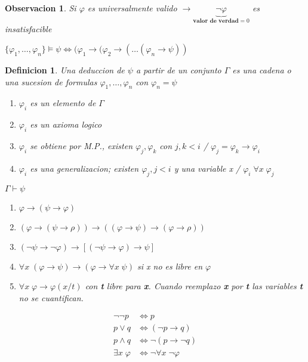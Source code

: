 \documentclass{amsart}
\newtheorem{definition}{Definicion}
\newtheorem{observation}{Observacion}
\begin{document}
\begin{observation}
Si $\varphi$ es universalmente valido $\rightarrow \underbrace{\neg \varphi}_{\textbf{valor de verdad} = 0}$ es insatisfacible

$\{ \varphi_1, \ldots, \varphi_n\} \models \psi \iff (\varphi_1 \rightarrow (\varphi_2 \rightarrow (\ldots (\varphi_n \rightarrow \psi))$
\end{observation}

\begin{definition}
Una deduccion de $\psi$ a partir de un conjunto $\Gamma$ es una cadena o una sucesion de formulas $\varphi_1, \ldots, \varphi_n$ con $\varphi_n = \psi$

\begin{enumerate}
	\item[$\bullet$] $\varphi_i$ es un elemento de $\Gamma$
	\item[$\bullet$] $\varphi_i$ es un axioma logico
	\item[$\bullet$] $\varphi_i$ se obtiene por M.P., existen $\varphi_j, \varphi_k$ con $j, k < i$ / $\varphi_j = \varphi_k \rightarrow \varphi_i$	
	\item[$\bullet$] $\varphi_i$ es una generalizacion; existen $\varphi_j, j < i$ y una variable x / $\varphi_i \; \forall x \; \varphi_j$
\end{enumerate}

$\Gamma \vdash \psi$

\begin{enumerate}
	\item[A1] $\varphi \rightarrow (\psi \rightarrow \varphi)$
	\item[A2] $(\varphi \rightarrow (\psi \rightarrow \rho)) \rightarrow ((\varphi \rightarrow \psi) \rightarrow (\varphi \rightarrow \rho))$
	\item[A3] $(\neg \psi \rightarrow \neg \varphi) \rightarrow [(\neg \psi \rightarrow \varphi) \rightarrow \psi]$
	\item[A4] $\forall x \; (\varphi \rightarrow \psi) \rightarrow (\varphi \rightarrow \forall x \; \psi)$ si x no es libre en $\varphi$
	\item[A5] $\forall x \; \varphi \rightarrow \varphi(x / t)$ con \textbf{t} libre para \textbf{x}. Cuando reemplazo \textbf{x} por \textbf{t} las variables \textbf{t} no se cuantifican.
\end{enumerate}

\begin{align*}
\neg \neg p &\iff p \\
p \lor q &\iff (\neg p \rightarrow q) \\
p \land q &\iff \neg (p \rightarrow \neg q) \\
\exists x \; \varphi &\iff \neg \forall x \; \neg \varphi
\end{align*}

\begin{example}

\end{example}

\end{definition}
\end{document}
